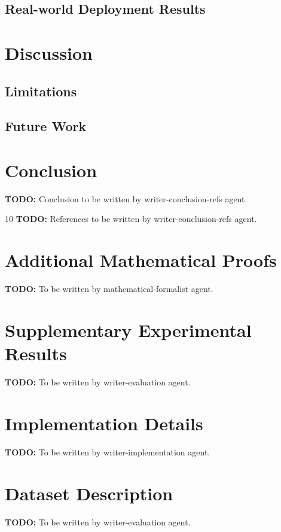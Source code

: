\documentclass[10pt,journal,compsoc]{IEEEtran}
\begin{document}
\subsection{Real-world Deployment Results}
\label{subsec:real-world}

\section{Discussion}
\label{sec:discussion}

\subsection{Limitations}
\label{subsec:limitations}

\subsection{Future Work}
\label{subsec:future}

\section{Conclusion}
\label{sec:conclusion}
\textbf{TODO:} Conclusion to be written by writer-conclusion-refs agent.



\begin{thebibliography}{10}
\textbf{TODO:} References to be written by writer-conclusion-refs agent.
\end{thebibliography}

\appendix

\section{Additional Mathematical Proofs}
\label{app:proofs}
\textbf{TODO:} To be written by mathematical-formalist agent.

\section{Supplementary Experimental Results}
\label{app:experiments}
\textbf{TODO:} To be written by writer-evaluation agent.

\section{Implementation Details}
\label{app:implementation}
\textbf{TODO:} To be written by writer-implementation agent.

\section{Dataset Description}
\label{app:dataset}
\textbf{TODO:} To be written by writer-evaluation agent.
\end{document}
